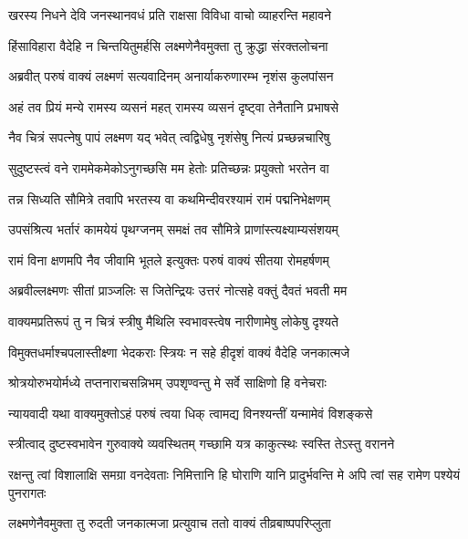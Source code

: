 \twolineshloka
{खरस्य निधने देवि जनस्थानवधं प्रति}
{राक्षसा विविधा वाचो व्याहरन्ति महावने} %

\twolineshloka
{हिंसाविहारा वैदेहि न चिन्तयितुमर्हसि}
{लक्ष्मणेनैवमुक्ता तु क्रुद्धा संरक्तलोचना} %

\twolineshloka
{अब्रवीत् परुषं वाक्यं लक्ष्मणं सत्यवादिनम्}
{अनार्याकरुणारम्भ नृशंस कुलपांसन} %

\twolineshloka
{अहं तव प्रियं मन्ये रामस्य व्यसनं महत्}
{रामस्य व्यसनं दृष्ट्वा तेनैतानि प्रभाषसे} %

\twolineshloka
{नैव चित्रं सपत्नेषु पापं लक्ष्मण यद् भवेत्}
{त्वद्विधेषु नृशंसेषु नित्यं प्रच्छन्नचारिषु} %

\twolineshloka
{सुदुष्टस्त्वं वने राममेकमेकोऽनुगच्छसि}
{मम हेतोः प्रतिच्छन्नः प्रयुक्तो भरतेन वा} %

\twolineshloka
{तन्न सिध्यति सौमित्रे तवापि भरतस्य वा}
{कथमिन्दीवरश्यामं रामं पद्मनिभेक्षणम्} %

\twolineshloka
{उपसंश्रित्य भर्तारं कामयेयं पृथग्जनम्}
{समक्षं तव सौमित्रे प्राणांस्त्यक्ष्याम्यसंशयम्} %

\twolineshloka
{रामं विना क्षणमपि नैव जीवामि भूतले}
{इत्युक्तः परुषं वाक्यं सीतया रोमहर्षणम्} %

\twolineshloka
{अब्रवील्लक्ष्मणः सीतां प्राञ्जलिः स जितेन्द्रियः}
{उत्तरं नोत्सहे वक्तुं दैवतं भवती मम} %

\twolineshloka
{वाक्यमप्रतिरूपं तु न चित्रं स्त्रीषु मैथिलि}
{स्वभावस्त्वेष नारीणामेषु लोकेषु दृश्यते} %

\twolineshloka
{विमुक्तधर्माश्चपलास्तीक्ष्णा भेदकराः स्त्रियः}
{न सहे हीदृशं वाक्यं वैदेहि जनकात्मजे} %

\twolineshloka
{श्रोत्रयोरुभयोर्मध्ये तप्तनाराचसन्निभम्}
{उपशृण्वन्तु मे सर्वे साक्षिणो हि वनेचराः} %

\twolineshloka
{न्यायवादी यथा वाक्यमुक्तोऽहं परुषं त्वया}
{धिक् त्वामद्य विनश्यन्तीं यन्मामेवं विशङ्कसे} %

\twolineshloka
{स्त्रीत्वाद् दुष्टस्वभावेन गुरुवाक्ये व्यवस्थितम्}
{गच्छामि यत्र काकुत्स्थः स्वस्ति तेऽस्तु वरानने} %

\threelineshloka
{रक्षन्तु त्वां विशालाक्षि समग्रा वनदेवताः}
{निमित्तानि हि घोराणि यानि प्रादुर्भवन्ति मे}
{अपि त्वां सह रामेण पश्येयं पुनरागतः} %

\twolineshloka
{लक्ष्मणेनैवमुक्ता तु रुदती जनकात्मजा}
{प्रत्युवाच ततो वाक्यं तीव्रबाष्पपरिप्लुता} %

